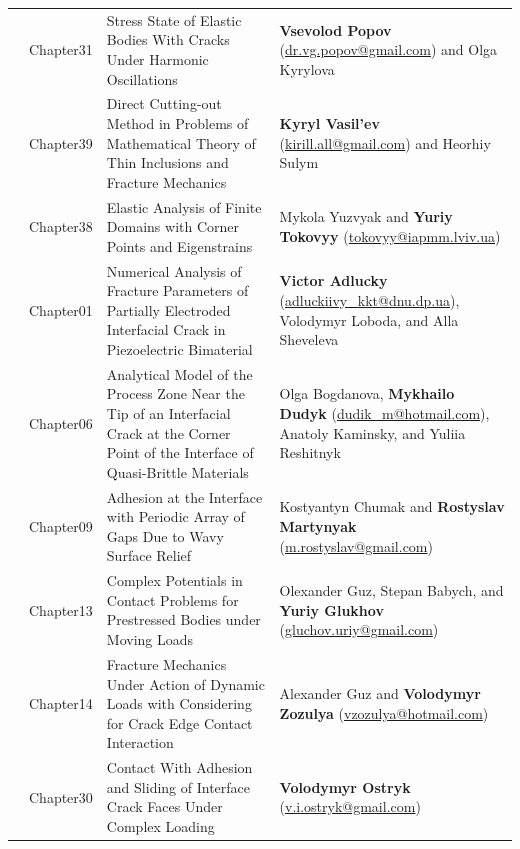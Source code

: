 \documentclass[12pt,a4paper]{article}
\begin{document}
\begin{longtable}{>{\RaggedRight\arraybackslash}p{1.1cm} >{\RaggedRight\arraybackslash}p{1.8cm} >{\RaggedRight\arraybackslash}p{6.4cm} >{\RaggedRight\arraybackslash}p{5.9cm}}
		5 & Chapter31 & Stress State of Elastic Bodies With Cracks Under Harmonic Oscillations & \textbf{Vsevolod Popov} (\href{mailto:dr.vg.popov@gmail.com}{dr.vg.popov@gmail.com}) and Olga Kyrylova \\
		
		6 & Chapter39 & Direct Cutting-out Method in Problems of Mathematical Theory of Thin Inclusions and Fracture Mechanics & \textbf{Kyryl Vasil'ev} (\href{mailto:kirill.all@gmail.com}{kirill.all@gmail.com}) and Heorhiy Sulym \\
		
		7 & Chapter38 & Elastic Analysis of Finite Domains with Corner Points and Eigenstrains & Mykola Yuzvyak and \textbf{Yuriy Tokovyy} (\href{mailto:tokovyy@iapmm.lviv.ua}{tokovyy@iapmm.lviv.ua}) \\
		
		8 & Chapter01 & Numerical Analysis of Fracture Parameters of Partially Electroded Interfacial Crack in Piezoelectric Bimaterial & \textbf{Victor Adlucky} (\href{mailto:adluckiivy_kkt@dnu.dp.ua}{adluckiivy\_kkt@dnu.dp.ua}), Volodymyr Loboda, and Alla Sheveleva \\
		
		9 & Chapter06 & Analytical Model of the Process Zone Near the Tip of an Interfacial Crack at the Corner Point of the Interface of Quasi-Brittle Materials & Olga Bogdanova, \textbf{Mykhailo Dudyk} (\href{mailto:dudik_m@hotmail.com}{dudik\_m@hotmail.com}), Anatoly Kaminsky, and Yuliia Reshitnyk \\
		
		10 & Chapter09 & Adhesion at the Interface with Periodic Array of Gaps Due to Wavy Surface Relief & Kostyantyn Chumak and \textbf{Rostyslav Martynyak} (\href{mailto:m.rostyslav@gmail.com}{m.rostyslav@gmail.com}) \\
		
		11 & Chapter13 & Complex Potentials in Contact Problems for Prestressed Bodies under Moving Loads & Olexander Guz, Stepan Babych, and \textbf{Yuriy Glukhov} (\href{mailto:gluchov.uriy@gmail.com}{gluchov.uriy@gmail.com}) \\
		
		12 & Chapter14 & Fracture Mechanics Under Action of Dynamic Loads with Considering for Crack Edge Contact Interaction & Alexander Guz and \textbf{Volodymyr Zozulya} (\href{mailto:vzozulya@hotmail.com}{vzozulya@hotmail.com}) \\
		
		13 & Chapter30 & Contact With Adhesion and Sliding of Interface Crack Faces Under Complex Loading & \textbf{Volodymyr Ostryk} (\href{mailto:v.i.ostryk@gmail.com}{v.i.ostryk@gmail.com}) \\
		

\end{longtable}
\end{document}
